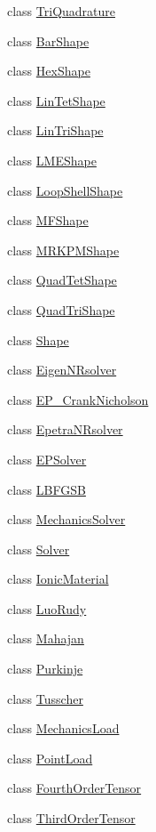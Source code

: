 \begin{DoxyCompactItemize}
class \hyperlink{classvoom_1_1_tri_quadrature}{TriQuadrature}
\item 
class \hyperlink{classvoom_1_1_bar_shape}{BarShape}
\item 
class \hyperlink{classvoom_1_1_hex_shape}{HexShape}
\item 
class \hyperlink{classvoom_1_1_lin_tet_shape}{LinTetShape}
\item 
class \hyperlink{classvoom_1_1_lin_tri_shape}{LinTriShape}
\item 
class \hyperlink{classvoom_1_1_l_m_e_shape}{LMEShape}
\item 
class \hyperlink{classvoom_1_1_loop_shell_shape}{LoopShellShape}
\item 
class \hyperlink{classvoom_1_1_m_f_shape}{MFShape}
\item 
class \hyperlink{classvoom_1_1_m_r_k_p_m_shape}{MRKPMShape}
\item 
class \hyperlink{classvoom_1_1_quad_tet_shape}{QuadTetShape}
\item 
class \hyperlink{classvoom_1_1_quad_tri_shape}{QuadTriShape}
\item 
class \hyperlink{classvoom_1_1_shape}{Shape}
\item 
class \hyperlink{classvoom_1_1_eigen_n_rsolver}{EigenNRsolver}
\item 
class \hyperlink{classvoom_1_1_e_p___crank_nicholson}{EP\_\-CrankNicholson}
\item 
class \hyperlink{classvoom_1_1_epetra_n_rsolver}{EpetraNRsolver}
\item 
class \hyperlink{classvoom_1_1_e_p_solver}{EPSolver}
\item 
class \hyperlink{classvoom_1_1_l_b_f_g_s_b}{LBFGSB}
\item 
class \hyperlink{classvoom_1_1_mechanics_solver}{MechanicsSolver}
\item 
class \hyperlink{classvoom_1_1_solver}{Solver}
\item 
class \hyperlink{classvoom_1_1_ionic_material}{IonicMaterial}
\item 
class \hyperlink{classvoom_1_1_luo_rudy}{LuoRudy}
\item 
class \hyperlink{classvoom_1_1_mahajan}{Mahajan}
\item 
class \hyperlink{classvoom_1_1_purkinje}{Purkinje}
\item 
class \hyperlink{classvoom_1_1_tusscher}{Tusscher}
\item 
class \hyperlink{classvoom_1_1_mechanics_load}{MechanicsLoad}
\item 
class \hyperlink{classvoom_1_1_point_load}{PointLoad}
\item 
class \hyperlink{classvoom_1_1_fourth_order_tensor}{FourthOrderTensor}
\item 
class \hyperlink{classvoom_1_1_third_order_tensor}{ThirdOrderTensor}
\end{DoxyCompactItemize}
